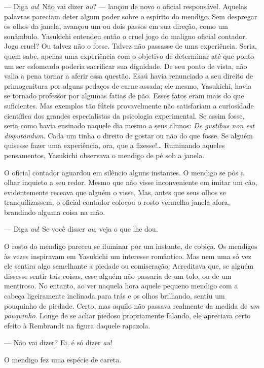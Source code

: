--- Diga \textit{au}! Não vai dizer \textit{au}? --- lançou de novo o oficial responsável.
Aquelas palavras pareciam deter algum poder sobre o espírito do
mendigo. Sem despregar os olhos da janela, avançou um ou dois passos em
sua direção, como um sonâmbulo. Yasukichi entendeu então o cruel jogo
do maligno oficial contador. Jogo cruel? Ou talvez não o fosse. Talvez
não passasse de uma experiência. Seria, quem sabe, apenas uma
experiência com o objetivo de determinar até que ponto um ser esfomeado
poderia sacrificar sua dignidade. De seu ponto de vista, não valia a
pena tornar a aferir essa questão. Esaú havia renunciado a seu direito
de primogenitura por alguns pedaços de carne assada; ele mesmo,
Yasukichi, havia se tornado professor por algumas fatias de pão. Esses
fatos eram mais do que suficientes. Mas exemplos tão fúteis
provavelmente não satisfariam a curiosidade científica dos grandes
especialistas da psicologia experimental. Se assim fosse, seria como
havia ensinado naquele dia mesmo a seus alunos: \textit{De gustibus 
non est disputandum}. Cada um tinha o direito de gostar ou
não do que fosse. Se alguém quisesse fazer uma experiência, ora, que a
fizesse!\ldots{} Ruminando aqueles pensamentos, Yasukichi observava o
mendigo de pé sob a janela.

O oficial contador aguardou em silêncio alguns instantes. O mendigo se
pôs a olhar inquieto a seu redor. Mesmo que não visse inconveniente em
imitar um cão, evidentemente receava que alguém o visse. Mas, antes que
seus olhos se tranquilizassem, o oficial contador colocou o rosto
vermelho janela afora, brandindo alguma coisa na mão.

--- Diga \textit{au}! Se você disser \textit{au}, veja o que lhe dou.

O rosto do mendigo pareceu se iluminar por um instante, de cobiça. Os
mendigos às vezes inspiravam em Yasukichi um interesse romântico. Mas
nem uma só vez ele sentira algo semelhante a piedade ou comiseração.
Acreditava que, se alguém dissesse sentir tais coisas, esse alguém não
passaria de um tolo, ou de um mentiroso. No entanto, ao ver naquela
hora aquele pequeno mendigo com a cabeça ligeiramente inclinada para
trás e os olhos brilhando, sentiu um pouquinho de piedade. Certo, mas
aquilo não passava realmente da medida de \textit{um pouquinho}. Longe de se
achar piedoso propriamente falando, ele apreciava certo efeito à
Rembrandt na figura daquele rapazola.

--- Não vai dizer? Ei, é só dizer \textit{au}!

O mendigo fez uma espécie de careta.


